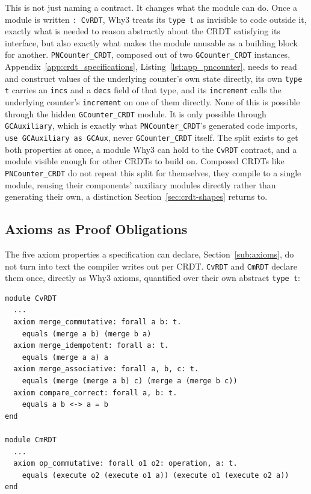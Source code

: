 This is not just naming a contract. It changes what the module can do. Once a module is written \texttt{: CvRDT}, Why3
treats its \texttt{type t} as invisible to code outside it, exactly what is needed to reason abstractly about the CRDT
satisfying its interface, but also exactly what makes the module unusable as a building block for another.
\texttt{PNCounter\_CRDT}, composed out of two \texttt{GCounter\_CRDT} instances, Appendix~\ref{app:crdt_specifications},
Listing~\ref{lst:app_pncounter}, needs to read and construct values of the underlying counter's own state directly, its
own \texttt{type t} carries an \texttt{incs} and a \texttt{decs} field of that type, and its \texttt{increment} calls
the underlying counter's \texttt{increment} on one of them directly. None of this is possible through the hidden
\texttt{GCounter\_CRDT} module. It is only possible through \texttt{GCAuxiliary}, which is exactly what
\texttt{PNCounter\_CRDT}'s generated code imports, \texttt{use GCAuxiliary as GCAux}, never \texttt{GCounter\_CRDT}
itself. The split exists to get both properties at once, a module Why3 can hold to the \texttt{CvRDT} contract, and a
module visible enough for other CRDTs to build on. Composed CRDTs like \texttt{PNCounter\_CRDT} do not repeat this split
for themselves, they compile to a single module, reusing their components' auxiliary modules directly rather than
generating their own, a distinction Section~\ref{sec:crdt-shapes} returns to.

\subsection{Axioms as Proof Obligations}
\label{sub:w3-axioms}

The five axiom properties a specification can declare, Section~\ref{sub:axioms}, do not turn into text the compiler writes
out per CRDT. \texttt{CvRDT} and \texttt{CmRDT} declare them once, directly as Why3 axioms, quantified over their own
abstract \texttt{type t}:

\begin{lstlisting}[caption={The built-in axioms, declared inside \texttt{CvRDT} and \texttt{CmRDT}}, label={lst:w3-axioms}]
module CvRDT
  ...
  axiom merge_commutative: forall a b: t.
    equals (merge a b) (merge b a)
  axiom merge_idempotent: forall a: t.
    equals (merge a a) a
  axiom merge_associative: forall a, b, c: t.
    equals (merge (merge a b) c) (merge a (merge b c))
  axiom compare_correct: forall a, b: t.
    equals a b <-> a = b
end

module CmRDT
  ...
  axiom op_commutative: forall o1 o2: operation, a: t.
    equals (execute o2 (execute o1 a)) (execute o1 (execute o2 a))
end
\end{lstlisting}

